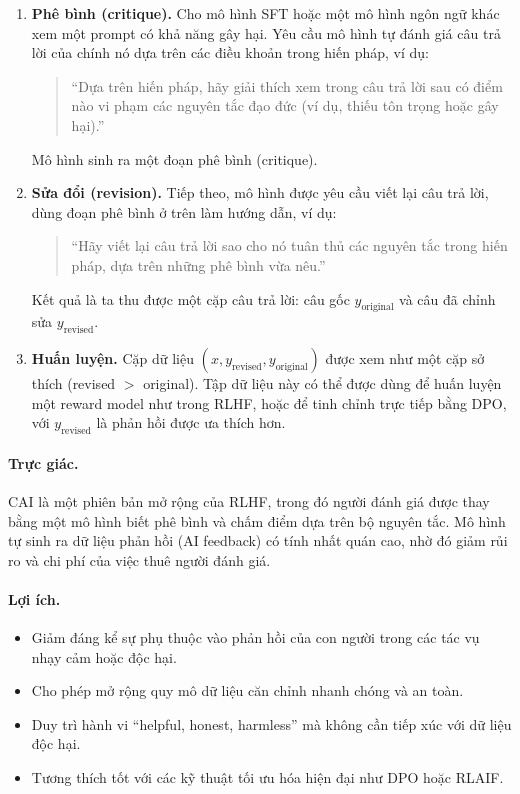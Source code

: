     \begin{enumerate}
        \item \textbf{Phê bình (critique).}
        Cho mô hình SFT hoặc một mô hình ngôn ngữ khác xem một prompt có khả năng gây hại.
        Yêu cầu mô hình tự đánh giá câu trả lời của chính nó dựa trên các điều khoản trong hiến pháp, ví dụ:
        \begin{quote}
            “Dựa trên hiến pháp, hãy giải thích xem trong câu trả lời sau có điểm nào vi phạm các nguyên tắc đạo đức (ví dụ, thiếu tôn trọng hoặc gây hại).” 
        \end{quote}
        Mô hình sinh ra một đoạn phê bình (critique).

        \item \textbf{Sửa đổi (revision).}
        Tiếp theo, mô hình được yêu cầu viết lại câu trả lời, dùng đoạn phê bình ở trên làm hướng dẫn, ví dụ:
        \begin{quote}
            “Hãy viết lại câu trả lời sao cho nó tuân thủ các nguyên tắc trong hiến pháp, dựa trên những phê bình vừa nêu.” 
        \end{quote}
        Kết quả là ta thu được một cặp câu trả lời: câu gốc $y_{\text{original}}$ và câu đã chỉnh sửa $y_{\text{revised}}$.

        \item \textbf{Huấn luyện.}
        Cặp dữ liệu $(x, y_{\text{revised}}, y_{\text{original}})$ được xem như một cặp sở thích (revised $>$ original).
        Tập dữ liệu này có thể được dùng để huấn luyện một reward model như trong RLHF, hoặc để tinh chỉnh trực tiếp bằng DPO, với $y_{\text{revised}}$ là phản hồi được ưa thích hơn.
    \end{enumerate}

\paragraph{Trực giác.}
    CAI là một phiên bản mở rộng của RLHF, trong đó người đánh giá được thay bằng một mô hình biết phê bình và chấm điểm dựa trên bộ nguyên tắc.
    Mô hình tự sinh ra dữ liệu phản hồi (AI feedback) có tính nhất quán cao, nhờ đó giảm rủi ro và chi phí của việc thuê người đánh giá.

\paragraph{Lợi ích.}
    \begin{itemize}
        \item Giảm đáng kể sự phụ thuộc vào phản hồi của con người trong các tác vụ nhạy cảm hoặc độc hại.
        \item Cho phép mở rộng quy mô dữ liệu căn chỉnh nhanh chóng và an toàn.
        \item Duy trì hành vi “helpful, honest, harmless” mà không cần tiếp xúc với dữ liệu độc hại.
        \item Tương thích tốt với các kỹ thuật tối ưu hóa hiện đại như DPO hoặc RLAIF.
    \end{itemize}

